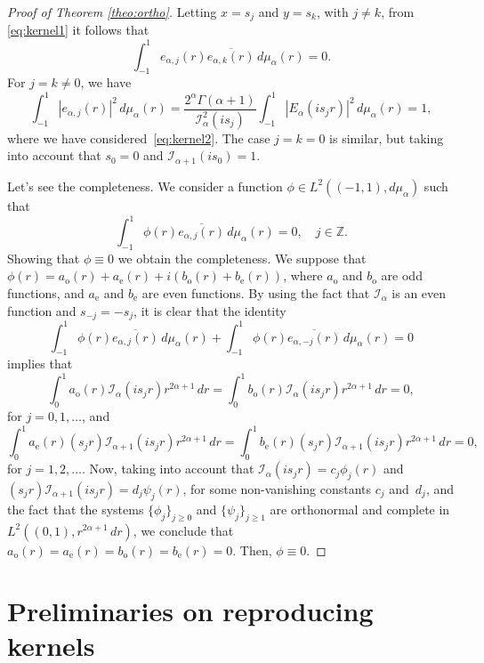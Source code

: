 \documentclass[11pt]{amsart}
\theoremstyle{plain}
\begin{document}
\begin{proof}[Proof of Theorem \ref{theo:ortho}]
Letting $x = s_j$ and $y = s_k$, with $j\not = k$, from \eqref{eq:kernel1} it follows that
\[
  \int_{-1}^1 e_{\alpha,j}(r)\overline{e_{\alpha,k}(r)}\, d\mu_{\alpha}(r) = 0.
\]
For $j = k \ne 0$, we have
\[
  \int_{-1}^1 |e_{\alpha,j}(r)|^2\,d\mu_{\alpha}(r)
  = \frac{2^{\alpha}\Gamma(\alpha+1)}{\mathcal{I}_\alpha^2(is_j)}
  \int_{-1}^1 |E_\alpha(is_jr)|^2\,d\mu_{\alpha}(r) = 1,
\]
where we have considered~\eqref{eq:kernel2}. The case $j = k = 0$ is similar, but taking into account that $s_0 = 0$ and $\mathcal{I}_{\alpha+1}(is_0) = 1$.

Let's see the completeness. We consider a function $\phi\in L^2((-1,1),d\mu_{\alpha})$ such that
\[
  \int_{-1}^1\phi(r) \overline{e_{\alpha,j}(r)}\, d\mu_{\alpha}(r) = 0,
  \quad j\in \mathbb{Z}.
\]
Showing that $\phi\equiv 0$ we obtain the completeness.
We suppose that
$\phi(r) = a_{\text{o}}(r) + a_{\text{e}}(r) + i(b_{\text{o}}(r) + b_{\text{e}}(r))$,
where $a_{\text{o}}$ and $b_{\text{o}}$ are odd functions, and $a_{\text{e}}$
and $b_{\text{e}}$ are even functions. By using the fact that $\mathcal{I}_{\alpha}$ is an even function and $s_{-j} = -s_j$, it is clear that the identity 
\[
  \int_{-1}^1\phi(r) \overline{e_{\alpha,j}(r)}\, d\mu_{\alpha}(r)
  + \int_{-1}^1\phi(r) \overline{e_{\alpha,-j}(r)}\, d\mu_{\alpha}(r) = 0
\]
implies that
\[
  \int_{0}^1 a_{\text{o}}(r) \mathcal{I}_{\alpha}(is_j r)r^{2\alpha+1}\,dr
  = \int_{0}^1 b_{\text{o}}(r) \mathcal{I}_{\alpha}(is_j r)r^{2\alpha+1}\,dr = 0, 
\]
for $j = 0,1,\dots$, and
\[
  \int_{0}^1 a_{\text{e}}(r)(s_j r) \mathcal{I}_{\alpha+1}(is_j r)r^{2\alpha+1}\,dr
  = \int_{0}^1 b_{\text{e}}(r)(s_j r) \mathcal{I}_{\alpha+1}(is_j r)r^{2\alpha+1}\,dr = 0, 
\]
for $j = 1,2,\dots$. Now, taking into account that
$\mathcal{I}_{\alpha}(is_j r) = c_j\phi_j(r)$
and $(s_j r)\mathcal{I}_{\alpha+1}(is_j r) = d_j\psi_j(r)$,
for some non-vanishing constants $c_j$ and~$d_j$, and the fact that the
systems $\{\phi_j\}_{j\ge0}$ and $\{\psi_j\}_{j\ge1}$
are orthonormal and complete in $L^2((0,1),r^{2\alpha+1}\,dr)$, we conclude that
$a_{\text{o}}(r) = a_{\text{e}}(r) = b_{\text{o}}(r) = b_{\text{e}}(r) = 0$.
Then, $\phi\equiv 0$.
\end{proof}

\section{Preliminaries on reproducing kernels}
\label{seq:repro}
\end{document}
